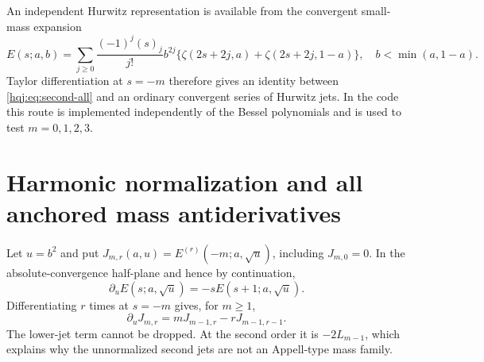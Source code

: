 \documentclass[11pt,letterpaper]{article}
\numberwithin{equation}{section}
\theoremstyle{definition}
\begin{document}
An independent Hurwitz representation is available from the convergent
small-mass expansion
\begin{equation}\label{hqj:eq:Ebinomial}
E(s;a,b)=\sum_{j\ge0}\frac{(-1)^j(s)_j}{j!}b^{2j}
\bigl\{\zeta(2s+2j,a)+\zeta(2s+2j,1-a)\bigr\},
\quad b<\min(a,1-a).
\end{equation}
Taylor differentiation at $s=-m$ therefore gives an identity between
\eqref{hqj:eq:second-all} and an ordinary convergent series of Hurwitz
jets. In the code this route is implemented independently of the Bessel
polynomials and is used to test $m=0,1,2,3$.


\section{Harmonic normalization and all anchored mass antiderivatives}
\label{hqj:sec:mass}

Let $u=b^2$ and put $J_{m,r}(a,u)=E^{(r)}(-m;a,\sqrt u)$, including
$J_{m,0}=0$. In the absolute-convergence half-plane and hence by
continuation,
\begin{equation}\label{hqj:eq:E-mass}
\partial_uE(s;a,\sqrt u)=-sE(s+1;a,\sqrt u).
\end{equation}
Differentiating $r$ times at $s=-m$ gives, for $m\ge1$,
\begin{equation}\label{hqj:eq:raw-transport}
\partial_uJ_{m,r}=mJ_{m-1,r}-rJ_{m-1,r-1}.
\end{equation}
The lower-jet term cannot be dropped. At the second order it is
$-2L_{m-1}$, which explains why the unnormalized second jets are not an
Appell-type mass family.
\end{document}
